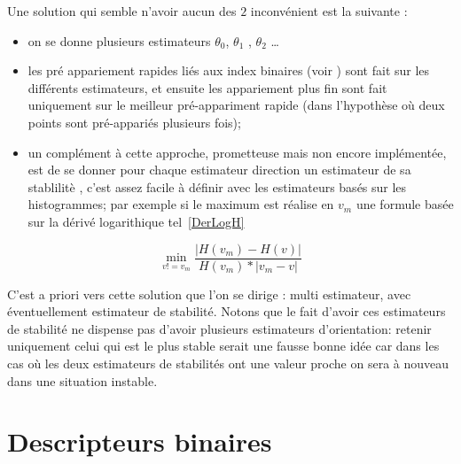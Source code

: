 Une solution qui semble n'avoir aucun des $2$ inconv\'enient est la suivante :

\begin{itemize}
   \item on se donne plusieurs estimateurs $\theta_0$, $\theta_1$ , $\theta_2$ \dots 

   \item les pr\'e appariement rapides li\'es aux index binaires (voir \RefFantome)  sont
         fait sur les diff\'erents estimateurs, et ensuite les appariement plus fin sont
         fait uniquement sur le meilleur pr\'e-appariment rapide (dans l'hypoth\`ese o\`u
         deux points sont pr\'e-appari\'es  plusieurs fois);

   \item  un compl\'ement \`a cette approche, prometteuse mais non encore impl\'ement\'ee, est de se donner
          pour chaque estimateur  direction un estimateur de sa stablilit\`e , c'est assez facile
         \`a d\'efinir avec les estimateurs bas\'es sur les histogrammes; 
          par exemple si  le maximum est r\'ealise en $v_m$ une formule bas\'ee sur la d\'eriv\'e logarithique
          tel~\ref{DerLogH}
\end{itemize}

\begin{equation}
    \min_{v!=v_m}\frac{|H(v_m)-H(v)|}{H(v_m)*|v_m-v|} \label{DerLogH}
\end{equation}

C'est a priori vers cette solution que l'on se dirige : multi estimateur, avec \'eventuellement estimateur
de stabilit\'e. Notons que le fait d'avoir ces estimateurs de stabilit\'e ne dispense pas d'avoir
plusieurs estimateurs d'orientation: retenir uniquement celui qui est le plus stable serait une fausse bonne id\'ee
car dans les cas o\`u les deux estimateurs de stabilit\'es ont une valeur proche on sera \`a 
nouveau dans une situation instable.


\section{Descripteurs binaires}

